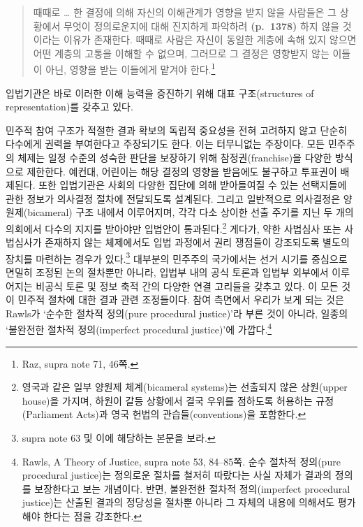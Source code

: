 \documentclass[a4paper,12pt,oneside]{article}  %
\begin{document}
\begin{quote}
때때로 \ldots{} 한 결정에 의해 자신의 이해관계가 영향을 받지 않을
사람들은 그 상황에서 무엇이 정의로운지에 대해 진지하게 파악하려
\textbf{(p.~1378)} 하지 않을 것이라는 이유가 존재한다. 때때로 사람은
자신이 동일한 계층에 속해 있지 않으면 어떤 계층의 고통을 이해할 수
없으며, 그러므로 그 결정은 영향받지 않는 이들이 아닌, 영향을 받는
이들에게 맡겨야 한다.\footnote{Raz, supra note 71, 46쪽.}
\end{quote}

입법기관은 바로 이러한 이해 능력을 증진하기 위해 대표 구조(structures of
representation)를 갖추고 있다.

민주적 참여 구조가 적절한 결과 확보의 독립적 중요성을 전혀 고려하지 않고
단순히 다수에게 권력을 부여한다고 주장되기도 한다. 이는 터무니없는
주장이다. 모든 민주주의 체제는 일정 수준의 성숙한 판단을 보장하기 위해
참정권(franchise)을 다양한 방식으로 제한한다. 예컨대, 어린이는 해당
결정의 영향을 받음에도 불구하고 투표권이 배제된다. 또한 입법기관은
사회의 다양한 집단에 의해 받아들여질 수 있는 선택지들에 관한 정보가
의사결정 절차에 전달되도록 설계된다. 그리고 일반적으로 의사결정은
양원제(bicameral) 구조 내에서 이루어지며, 각각 다소 상이한 선출 주기를
지닌 두 개의 의회에서 다수의 지지를 받아야만 입법안이
통과된다.\footnote{영국과 같은 일부 양원제 체계(bicameral systems)는
  선출되지 않은 상원(upper house)을 가지며, 하원이 갈등 상황에서 결국
  우위를 점하도록 허용하는 규정(Parliament Acts)과 영국 헌법의
  관습들(conventions)을 포함한다.} 게다가, 약한 사법심사 또는 사법심사가
존재하지 않는 체제에서도 입법 과정에서 권리 쟁점들이 강조되도록 별도의
장치를 마련하는 경우가 있다.\footnote{supra note 63 및 이에 해당하는
  본문을 보라.} 대부분의 민주주의 국가에서는 선거 시기를 중심으로 면밀히
조정된 논의 절차뿐만 아니라, 입법부 내의 공식 토론과 입법부 외부에서
이루어지는 비공식 토론 및 정보 축적 간의 다양한 연결 고리들을 갖추고
있다. 이 모든 것이 민주적 절차에 대한 결과 관련 조정들이다. 참여
측면에서 우리가 보게 되는 것은 Rawls가 `순수한 절차적 정의(pure
procedural justice)'라 부른 것이 아니라, 일종의 `불완전한 절차적
정의(imperfect procedural justice)'에 가깝다.\footnote{Rawls, A Theory
  of Justice, supra note 53, 84--85쪽. 순수 절차적 정의(pure procedural
  justice)는 정의로운 절차를 철저히 따랐다는 사실 자체가 결과의 정의를
  보장한다고 보는 개념이다. 반면, 불완전한 절차적 정의(imperfect
  procedural justice)는 산출된 결과의 정당성을 절차뿐 아니라 그 자체의
  내용에 의해서도 평가해야 한다는 점을 강조한다.}
\end{document}
